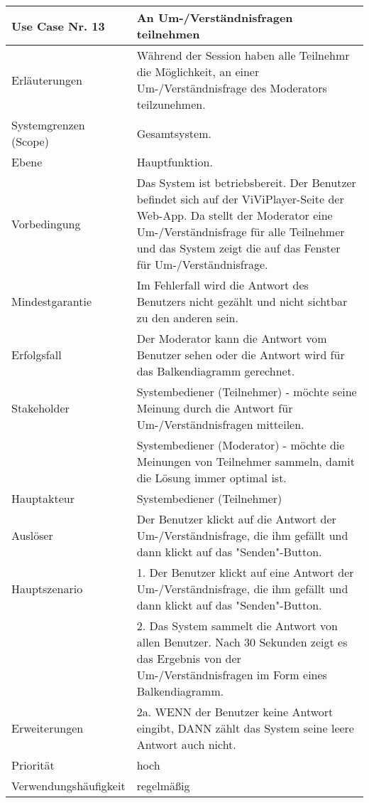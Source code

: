 \begin{tabularx}{\linewidth}{|l|X|}
	\hline
	Use Case Nr. 13			& \textbf{An Um-/Verständnisfragen teilnehmen} \\ \hline
	Erläuterungen			& Während der Session haben alle Teilnehmr die Möglichkeit, an einer 
							  Um-/Verständnisfrage des Moderators teilzunehmen. \\ \hline
	Systemgrenzen (Scope)	& Gesamtsystem. \\ \hline
	Ebene					& Hauptfunktion. \\ \hline
	Vorbedingung			& Das System ist betriebsbereit. Der Benutzer befindet sich auf der 
							  ViViPlayer-Seite der Web-App. Da stellt der Moderator eine Um-/Verständnisfrage für alle Teilnehmer und das System zeigt die auf das Fenster für Um-/Verständnisfrage. \\ \hline
	Mindestgarantie			& Im Fehlerfall wird die Antwort des Benutzers nicht gezählt und 
							  nicht sichtbar zu den anderen sein. \\ \hline
	Erfolgsfall				& Der Moderator kann die Antwort vom Benutzer sehen oder die Antwort 
							  wird für das Balkendiagramm gerechnet. \\ \hline
	Stakeholder				& Systembediener (Teilnehmer) - möchte seine Meinung durch die 
							  Antwort für Um-/Verständnisfragen mitteilen. \\ 
							& Systembediener (Moderator) - möchte die Meinungen von Teilnehmer 
							  sammeln, damit die Lösung immer optimal ist. \\ \hline
	Hauptakteur				& Systembediener (Teilnehmer) \\ \hline
	Auslöser				& Der Benutzer klickt auf die Antwort der Um-/Verständnisfrage, die 
							  ihm gefällt und dann klickt auf das "Senden"-Button. \\ \hline	
	Hauptszenario			& 1. Der Benutzer klickt auf eine Antwort der Um-/Verständnisfrage, 
							  die ihm gefällt und dann klickt auf das "Senden"-Button. \\
							& 2. Das System sammelt die Antwort von allen Benutzer. Nach 30 
							  Sekunden zeigt es das Ergebnis von der Um-/Verständnisfragen im 
							  Form eines Balkendiagramm. \\ \hline
	Erweiterungen			& 2a. WENN der Benutzer keine Antwort eingibt, DANN zählt das System 
							  seine leere Antwort auch nicht. \\ \hline
	Priorität				& hoch \\ \hline
	Verwendungshäufigkeit	& regelmäßig \\ \hline
\end{tabularx}


